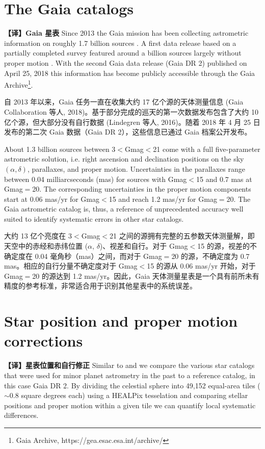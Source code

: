 \documentclass[review]{elsarticle}
\begin{document}
\section{The Gaia catalogs} 
\textbf{【译】Gaia 星表}
\label{sec:gaiadr2}
Since 2013 the Gaia mission has been collecting astrometric information on roughly 1.7 billion sources \citep{gaiadr2}. A first data release based on a partially completed survey featured around a billion sources largely without proper motion \citep{gaiadr1}.
With the second Gaia data release (Gaia DR 2) published on April 25, 2018 this information has become publicly accessible through the Gaia Archive\footnote{Gaia Archive, https://gea.esac.esa.int/archive/}. 

自 2013 年以来，Gaia 任务一直在收集大约 17 亿个源的天体测量信息 (Gaia Collaboration 等人, 2018)。基于部分完成的巡天的第一次数据发布包含了大约 10 亿个源，但大部分没有自行数据 (Lindegren 等人, 2016)。随着 2018 年 4 月 25 日发布的第二次 Gaia 数据（Gaia DR 2），这些信息已通过 Gaia 档案公开发布。

About 1.3 billion sources between 3$<$Gmag$<$21 come with a full five-parameter astrometric solution, i.e. right ascension and declination positions on the sky $(\alpha,\delta)$, parallaxes, and proper motion. Uncertainties in the parallaxes range between 0.04 milliarcseconds (mas) for sources with Gmag$<$15 and 0.7 mas at Gmag$=$20. The corresponding uncertainties in the proper motion components start at 0.06 mas/yr for Gmag$<$15 and reach 1.2 mas/yr for Gmag$=$20. The Gaia astrometric catalog is, thus, a reference of unprecedented accuracy well suited to identify systematic errors in other star catalogs.

大约 13 亿个亮度在 3$<$Gmag$<$21 之间的源拥有完整的五参数天体测量解，即天空中的赤经和赤纬位置 ($\alpha$, $\delta$)、视差和自行。对于 Gmag$<$15 的源，视差的不确定度在 0.04 毫角秒（mas）之间，而对于 Gmag$=$20 的源，不确定度为 0.7 mas。相应的自行分量不确定度对于 Gmag$<$15 的源从 0.06 mas/yr 开始，对于 Gmag$=$20 的源达到 1.2 mas/yr。因此，Gaia 天体测量星表是一个具有前所未有精度的参考标准，非常适合用于识别其他星表中的系统误差。
\section{Star position and proper motion corrections} 
\textbf{【译】星表位置和自行修正}
\label{sec:debias}
Similar to \citet{chesley10} and \citet{farnocchia15} we compare the various star catalogs that were used for minor planet astrometry in the past to a reference catalog, in this case Gaia DR 2. 
By dividing the celestial sphere into 49,152
equal-area tiles ($\sim$0.8 square degrees each) using a HEALPix tesselation
\citep{healpix} and comparing stellar positions and proper motion within a given tile we can quantify local systematic differences.
\end{document}
